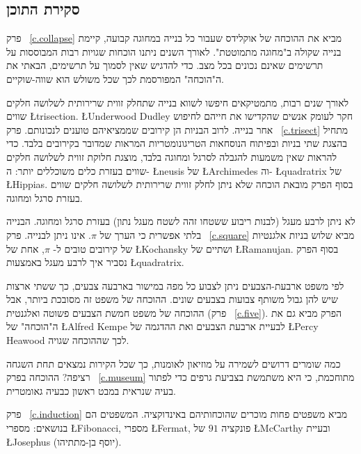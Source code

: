 \subsection*{סקירת התוכן}


פרק~%
\ref{c.collapse}
מביא את ההוכחה של אוקלידס שעבור כל בנייה במחוגה קבועה, קיימת בנייה שקולה ב"מחוגה מתמוטטת". לאורך השנים ניתנו הוכחות שגויות רבות המבוססות על תרשימים שאינם נכונים בכל מצב. כדי להדגיש שאין לסמוך על תרשימים, הבאתי את ה"הוכחה" המפורסמת לכך שכל משולש הוא שווה-שוקיים.

לאורך שנים רבות, מתמטיקאים חיפשו לשווא בנייה שתחלק זווית שרירותית לשלושה חלקים שווים
\L{trisection}.
\L{Underwood Dudley}
חקר לעומק אנשים שהקדישו את חייהם לחיפוש אחר בנייה. לרוב הבניות הן קירובים שממציאיהם טוענים לנכונותם. פרק~%
\ref{c.trisect}
מתחיל בהצגת שתי בניות ובפיתוח הנוסחאות הטריגונומטריות המראות שמדובר בקירובים בלבד. כדי להראות שאין משמעות להגבלה לסרגל ומחוגה בלבד, מוצגת חלוקת זווית לשלושה חלקים שווים בעזרת כלים משוכללים יותר: ה-%
\L{neusis}
של
\L{Archimedes}
וה-%
\L{quadratrix}
של
\L{Hippias}.
בסוף הפרק מובאת הוכחה שלא ניתן לחלק זווית שרירותית לשלושה חלקים שווים בעזרת סרגל ומחוגה.

לא ניתן לרבע מעגל (לבנות ריבוע ששטחו זהה לשטח מעגל נתון) בעזרת סרגל ומחוגה. הבנייה בלתי אפשרית כי הערך של 
$\pi$.
אינו ניתן לבנייה. 
פרק~%
\ref{c.square}
מביא שלוש בניות אלגנטיות של קירובים טובים ל-%
$\pi$,
אחת של
\L{Kochansky}
ושתיים של
\L{Ramanujan}.
בסוף הפרק נסביר איך לרבע מעגל באמצעות
\L{quadratrix}.


לפי משפט ארבעת-הצבעים ניתן לצבוע כל מפה במישור בארבעה צבעים, כך ששתי ארצות שיש להן גבול משותף צבועות בצבעים שונים. ההוכחה של משפט זה מסובכת ביותר, אבל ההוכחה של משפט חמשת הצבעים פשוטה ואלגנטית (פרק%
~\ref{c.five}).
הפרק מביא גם את ה"הוכחה" של 
\L{Alfred Kempe}
לבעיית ארבעת הצבעים ואת ההדגמה של 
\L{Percy Heawood}
לכך שההוכחה שגויה.


כמה שומרים דרושים לשמירה על מוזיאון לאומנות, כך שכל הקירות נמצאים תחת השגחה רציפה? ההוכחה בפרק%
~\ref{c.museum}
מתוחכמת, כי היא משתמשת בצביעת גרפים כדי לפתור בעיה שנראית במבט ראשון כבעיה גאומטרית.


פרק~%
\ref{c.induction}
מביא משפטים פחות מוכרים שהוכחותיהם באינדוקציה. המשפטים הם בנושאים: מספרי 
\L{Fibonacci}, 
מספרי
\L{Fermat},
פונקציה 
$91$
של 
\L{McCarthy}
ובעיית
\L{Josephus}
(יוסף בן-מתתיהו).

